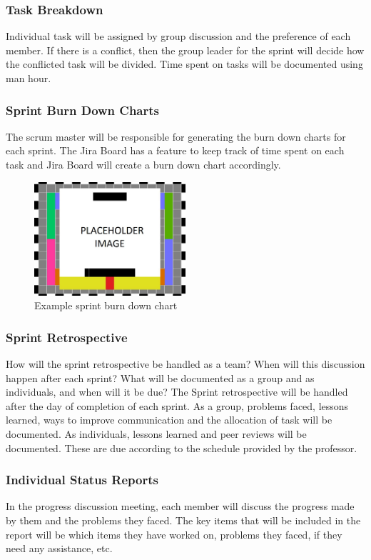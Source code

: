 \subsubsection{Task Breakdown}
Individual task will be assigned by group discussion and the preference of each member. If there is a conflict, then the group leader for the sprint will decide how the conflicted task will be divided. Time spent on tasks will be documented using man hour.

\subsubsection{Sprint Burn Down Charts}
The scrum master will be responsible for generating the burn down charts for each sprint. The Jira Board has a feature to keep track of time spent on each task and Jira Board will create a burn down chart accordingly.

\begin{figure}[h!]
    \centering
    \includegraphics[width=0.5\textwidth]{images/test_image}
    \caption{Example sprint burn down chart}
\end{figure}

\subsubsection{Sprint Retrospective}
How will the sprint retrospective be handled as a team? When will this discussion happen after each sprint? What will be documented as a group and as individuals, and when will it be due?
The Sprint retrospective will be handled after the day of completion of each sprint. As a group, problems faced, lessons learned, ways to improve communication and the allocation of task will be documented. As individuals, lessons learned and peer reviews will be documented. These are due according to the schedule provided by the professor.

\subsubsection{Individual Status Reports}
In the progress discussion meeting, each member will discuss the progress made by them and the problems they faced. The key items that will be included in the report will be which items they have worked on, problems they faced, if they need any assistance, etc.

